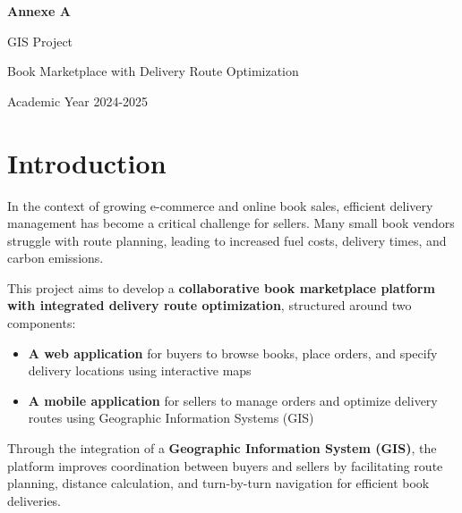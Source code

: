 \documentclass[12pt,a4paper]{article}
\begin{document}
\begin{titlepage}
    \centering
    \vspace*{2cm}

    {\Huge\bfseries Annexe A\par}
    \vspace{1cm}
    {\LARGE GIS Project\par}
    \vspace{0.5cm}
    {\Large Book Marketplace with Delivery Route Optimization\par}

    \vspace{2cm}

    \begin{figure}[h]
        \centering
    \end{figure}

    \vfill

    {\large Academic Year 2024-2025\par}
\end{titlepage}

\tableofcontents
\newpage

\section{Introduction}

In the context of growing e-commerce and online book sales, efficient delivery management has become a critical challenge for sellers. Many small book vendors struggle with route planning, leading to increased fuel costs, delivery times, and carbon emissions.

This project aims to develop a \textbf{collaborative book marketplace platform with integrated delivery route optimization}, structured around two components:

\begin{itemize}
    \item \textbf{A web application} for buyers to browse books, place orders, and specify delivery locations using interactive maps
    \item \textbf{A mobile application} for sellers to manage orders and optimize delivery routes using Geographic Information Systems (GIS)
\end{itemize}

Through the integration of a \textbf{Geographic Information System (GIS)}, the platform improves coordination between buyers and sellers by facilitating route planning, distance calculation, and turn-by-turn navigation for efficient book deliveries.
\end{document}
